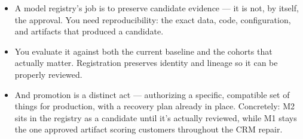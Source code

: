 \documentclass[11pt,a4paper]{article}
\begin{document}
\begin{examplebox}[title after break={SPOKEN SCRIPT --- slide 36 continued}]
\begin{itemize}
\item A model registry's job is to preserve candidate evidence — it is not, by itself, the approval. You need reproducibility: the exact data, code, configuration, and artifacts that produced a candidate.
\item You evaluate it against both the current baseline and the cohorts that actually matter. Registration preserves identity and lineage so it can be properly reviewed.
\item And promotion is a distinct act — authorizing a specific, compatible set of things for production, with a recovery plan already in place. Concretely: M2 sits in the registry as a candidate until it's actually reviewed, while M1 stays the one approved artifact scoring customers throughout the CRM repair.
\end{itemize}
\end{examplebox}
\par\noindent{\scriptsize\textcolor{teal!60!black}{Reading anchor: Bass, §14.1 · Kalinowski, §16.3–16.5 (supporting)}}
\clearpage
\end{document}
